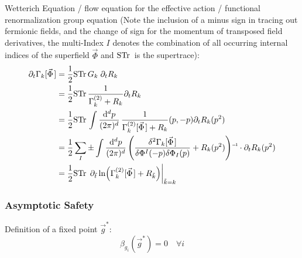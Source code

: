 			\noindent
			Wetterich Equation / flow equation for the effective action / functional renormalization group equation (Note the inclusion of a minus sign in tracing out fermionic fields, and the change of sign for the momentum of transposed field derivatives, the multi-Index $I$ denotes the combination of all occurring internal indices of the superfield $\vec{\Phi}$ and $\mathrm{STr}\,$ is the supertrace):
			\begin{equation}
				\begin{aligned}
					\partial_t \Gamma_k[\vec{\Phi}]
					&= \frac{1}{2} \Str G_k \;\partial_t R_k \\
					&= \frac{1}{2} \Str \frac{1}{\Gamma^{(2)}_k + R_k} \partial_t R_k \\
					&= \frac{1}{2} \Str \int \frac{\dd^d p}{(2\pi)^d} \, \frac{1}{\Gamma^{(2)}_k[\vec{\Phi}] + R_k}(p,-p) \partial_t R_k(p^2) \\
					&= \frac{1}{2} \sum_I \pm \int \frac{\dd^d p}{(2\pi)^d} \, \inv{\qty(\frac{\delta^2 \Gamma_k[\vec{\Phi}]}{\delta \Phi^I(-p) \delta \Phi_I(p)} + R_k(p^2))} \cdot \partial_t R_k(p^2) \\
					&= \frac{1}{2} \Str \eval{\partial_{\tilde{t}} \ln(\Gamma^{(2)}_k[\vec{\Phi}] + R_{\tilde{k}})}_{\tilde{k} = k}
				\end{aligned}
			\end{equation}

		\subsubsection{Asymptotic Safety}
			\noindent
			Definition of a fixed point $\vec{g}^{*}$:
			\begin{equation}
				\beta_{g_i}(\vec{g}^{*}) = 0 \quad \forall i
			\end{equation}

